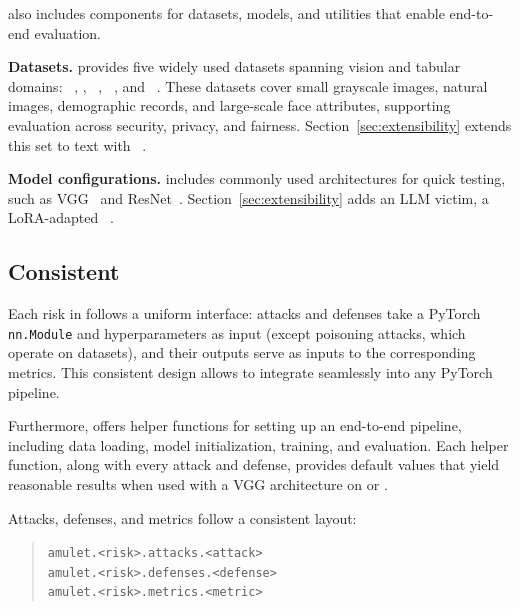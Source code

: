\method also includes components for datasets, models, and utilities that enable end-to-end evaluation.

\noindent\textbf{Datasets.}
\method provides five widely used datasets spanning vision and tabular domains:
\fmnist~\cite{xiao2017FashionMNISTNovelImage}, \cifar, \census~\cite{kohavi1996CensusIncome}, \lfw~\cite{melis2019ExploitingUnintendedFeature}, and \celeba~\cite{liu2015DeepLearningFace}.
These datasets cover small grayscale images, natural images, demographic records, and large-scale face attributes,
supporting evaluation across security, privacy, and fairness.
Section~\ref{sec:extensibility} extends this set to text with \sstwo~\cite{socher2013RecursiveDeepModels}.

\noindent\textbf{Model configurations.}
\method includes commonly used architectures for quick testing, such as VGG~\cite{liu2015VeryDeepConvolutional} and ResNet~\cite{he2016DeepResidualLearning}.
Section~\ref{sec:extensibility} adds an LLM victim, a LoRA-adapted \llama~\cite{llamateammetaai2024Llama3Herd}.

\subsection{Consistent}
Each risk in \method follows a uniform interface: attacks and defenses take a PyTorch \texttt{nn.Module} and hyperparameters as input (except poisoning attacks, which operate on datasets), and their outputs serve as inputs to the corresponding metrics.
This consistent design allows \method to integrate seamlessly into any PyTorch pipeline.

Furthermore, \method offers helper functions for setting up an end-to-end pipeline, including data loading, model initialization, training, and evaluation.
Each helper function, along with every attack and defense, provides default values that yield reasonable results when used with a VGG architecture on \celeba or \cifar.

Attacks, defenses, and metrics follow a consistent layout:
\begingroup
\setlength{\topsep}{0pt}
\setlength{\partopsep}{0pt}
\begin{quote}
  \texttt{amulet.<risk>.attacks.<attack>} \\
  \texttt{amulet.<risk>.defenses.<defense>} \\
  \texttt{amulet.<risk>.metrics.<metric>}
\end{quote}
\endgroup



